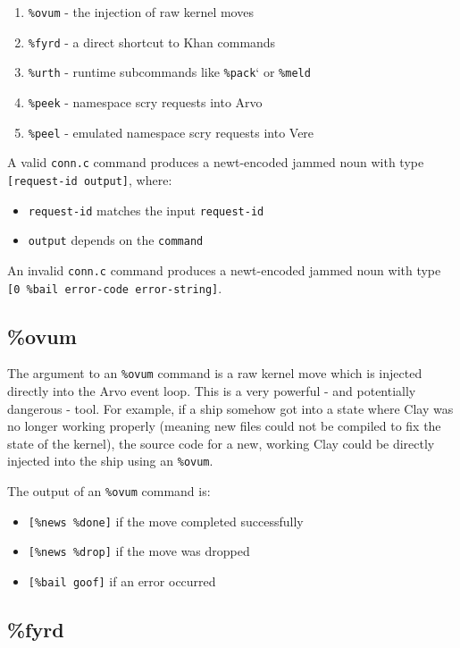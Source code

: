 \documentclass[twoside]{article}
\begin{document}
\begin{enumerate}
  \item \texttt{\%ovum} - the injection of raw kernel moves 
  \item \texttt{\%fyrd} - a direct shortcut to Khan commands
  \item \texttt{\%urth} - runtime subcommands like \texttt{\%pack}` or \texttt{\%meld}
  \item \texttt{\%peek} - namespace scry requests into Arvo
  \item \texttt{\%peel} - emulated namespace scry requests into Vere
\end{enumerate}

A valid \texttt{conn.c} command produces a newt-encoded jammed noun with type \texttt{[request-id output]}, where:
\begin{itemize}
  \item \texttt{request-id} matches the input \texttt{request-id}
  \item \texttt{output} depends on the \texttt{command}
\end{itemize}

An invalid \texttt{conn.c} command produces a newt-encoded jammed noun with type \texttt{[0 \%bail error-code error-string]}. 

\subsection{\%ovum}

The argument to an \texttt{\%ovum} command is a raw kernel move which is injected directly into the Arvo event loop. This is a very powerful - and potentially dangerous - tool. For example, if a ship somehow got into a state where Clay was no longer working properly (meaning new files could not be compiled to fix the state of the kernel), the source code for a new, working Clay could be directly injected into the ship using an \texttt{\%ovum}.

The output of an \texttt{\%ovum} command is:
\begin{itemize}
  \item \texttt{[\%news \%done]} if the move completed successfully
  \item \texttt{[\%news \%drop]} if the move was dropped
  \item \texttt{[\%bail goof]} if an error occurred
\end{itemize}

\subsection{\%fyrd}
\end{document}
